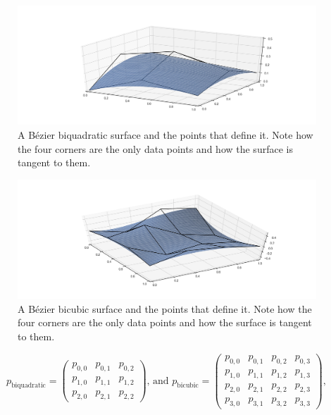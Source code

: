 \begin{figure}
\centering
\includegraphics[width=\linewidth]{figs/quadraticsurf}
\caption{A B\'ezier biquadratic surface and the points that define it.
Note how the four corners are the only data points and how the surface is tangent to them.}%
\label{fig:quadraticsurf}
\end{figure}

\begin{figure}
\centering
\includegraphics[width=\linewidth]{figs/cubicsurf}
\caption{A B\'ezier bicubic surface and the points that define it.
Note how the four corners are the only data points and how the surface is tangent to them.}%
\label{fig:cubicsurf}
\end{figure}

\begin{equation}
p_{\mathrm{biquadratic}} = \left(\begin{array}{ccc}
p_{0,0} & p_{0,1} & p_{0,2} \\
p_{1,0} & p_{1,1} & p_{1,2} \\
p_{2,0} & p_{2,1} & p_{2,2} 
\end{array}\right)\text{, and }
p_{\mathrm{bicubic}} = \left(\begin{array}{cccc}
p_{0,0} & p_{0,1} & p_{0,2} & p_{0,3} \\
p_{1,0} & p_{1,1} & p_{1,2} & p_{1,3} \\
p_{2,0} & p_{2,1} & p_{2,2} & p_{2,3} \\
p_{3,0} & p_{3,1} & p_{3,2} & p_{3,3}
\end{array}\right),
\end{equation}


